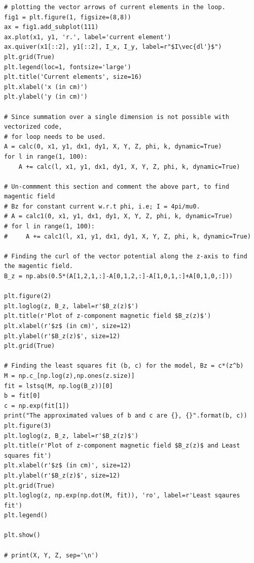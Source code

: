 \documentclass[12pt, a4paper]{article}
\begin{document}
\begin{lstlisting}
# plotting the vector arrows of current elements in the loop.
fig1 = plt.figure(1, figsize=(8,8))
ax = fig1.add_subplot(111)
ax.plot(x1, y1, 'r.', label='current element')
ax.quiver(x1[::2], y1[::2], I_x, I_y, label=r"$I\vec{dl'}$")
plt.grid(True)
plt.legend(loc=1, fontsize='large')
plt.title('Current elements', size=16)
plt.xlabel('x (in cm)')
plt.ylabel('y (in cm)')

# Since summation over a single dimension is not possible with vectorized code,
# for loop needs to be used.
A = calc(0, x1, y1, dx1, dy1, X, Y, Z, phi, k, dynamic=True)
for l in range(1, 100):
    A += calc(l, x1, y1, dx1, dy1, X, Y, Z, phi, k, dynamic=True)

# Un-commment this section and comment the above part, to find magentic field
# Bz for constant current w.r.t phi, i.e; I = 4pi/mu0. 
# A = calc1(0, x1, y1, dx1, dy1, X, Y, Z, phi, k, dynamic=True)
# for l in range(1, 100):
#     A += calc1(l, x1, y1, dx1, dy1, X, Y, Z, phi, k, dynamic=True)

# Finding the curl of the vector potential along the z-axis to find the magentic field.
B_z = np.abs(0.5*(A[1,2,1,:]-A[0,1,2,:]-A[1,0,1,:]+A[0,1,0,:]))

plt.figure(2)
plt.loglog(z, B_z, label=r'$B_z(z)$')
plt.title(r'Plot of z-component magnetic field $B_z(z)$')
plt.xlabel(r'$z$ (in cm)', size=12)
plt.ylabel(r'$B_z(z)$', size=12)
plt.grid(True)

# Finding the least squares fit (b, c) for the model, Bz = c*(z^b)
M = np.c_[np.log(z),np.ones(z.size)]
fit = lstsq(M, np.log(B_z))[0]
b = fit[0]
c = np.exp(fit[1])
print("The approximated values of b and c are {}, {}".format(b, c))
plt.figure(3)
plt.loglog(z, B_z, label=r'$B_z(z)$')
plt.title(r'Plot of z-component magnetic field $B_z(z)$ and Least squares fit')
plt.xlabel(r'$z$ (in cm)', size=12)
plt.ylabel(r'$B_z(z)$', size=12)
plt.grid(True)
plt.loglog(z, np.exp(np.dot(M, fit)), 'ro', label=r'Least sqaures fit')
plt.legend()

plt.show()

# print(X, Y, Z, sep='\n')
\end{lstlisting}
\end{document}
